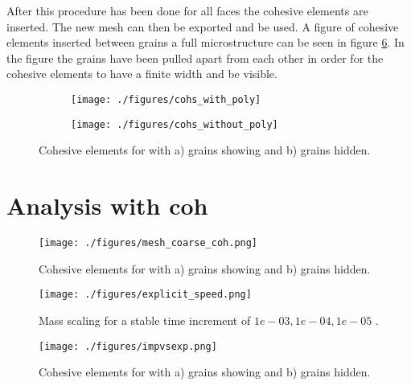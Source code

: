 \documentclass[grain_boundary_law.tex]{subfiles}
\begin{document}
After this procedure has been done for all faces the cohesive elements are inserted. The new mesh can then be exported and be used. A figure of cohesive elements inserted between grains a full microstructure can be seen in figure \ref{fig:cohs_large}. In the figure the grains have been pulled apart from each other in order for the cohesive elements to have a finite width and be visible.



\begin{figure}
\centering
\begin{subfigure}[b]{.5\textwidth}
  \centering
  \texttt{[image: ./figures/cohs\_with\_poly]}
  \caption{}
  \label{fig:cohs_large_a}
\end{subfigure}%
\begin{subfigure}[b]{.5\textwidth}
  \centering
  \texttt{[image: ./figures/cohs\_without\_poly]}
  \caption{}
  \label{fig:cohs_large_b}
\end{subfigure}
\caption{Cohesive elements for with a) grains showing and b) grains hidden.}
\label{fig:cohs_large}
\end{figure}


\section{Analysis with coh}


\begin{figure}
\centering
\texttt{[image: ./figures/mesh\_coarse\_coh.png]}
\caption{Cohesive elements for with a) grains showing and b) grains hidden.}
\label{fig:cohs_large}
\end{figure}

\begin{figure}
\centering
\texttt{[image: ./figures/explicit\_speed.png]}
\caption{Mass scaling for a stable time increment of $1e-03,1e-04,1e-05$ .}
\label{fig:cohs_large}
\end{figure}

\begin{figure}
\centering
\texttt{[image: ./figures/impvsexp.png]}
\caption{Cohesive elements for with a) grains showing and b) grains hidden.}
\label{fig:cohs_large}
\end{figure}
\end{document}
